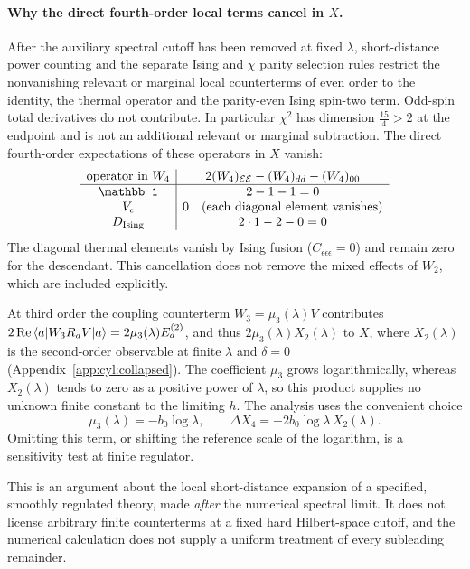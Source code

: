 \documentclass[11pt,a4paper]{article}
\numberwithin{equation}{section}
\newcommand{\ket}[1]{\lvert#1\rangle}
\begin{document}
\paragraph{Why the direct fourth-order local terms cancel in $X$.} After the auxiliary spectral cutoff has been removed
at fixed $\lambda$, short-distance power counting and the separate Ising and $\chi$ parity selection rules restrict the
nonvanishing relevant or marginal local counterterms of even order to the identity, the thermal operator and the
parity-even Ising spin-two term. Odd-spin total derivatives do not contribute. In particular $\chi^2$ has dimension
$\frac{15}{4}>2$ at the endpoint and is not an additional relevant or marginal subtraction. The direct fourth-order
expectations of these operators in $X$ vanish:
\begin{equation}
\begin{array}{c|c}
 \text{operator in }W_4 & 2(W_4)_{\mathcal E\mathcal E}-(W_4)_{dd}-(W_4)_{00}\\\hline
 \mathbb 1 & 2-1-1=0\\
 V_\epsilon & 0\quad\text{(each diagonal element vanishes)}\\
 D_{\rm Ising} & 2\cdot1-2-0=0
\end{array}
\label{eq:cyl:W4}
\end{equation}
The diagonal thermal elements vanish by Ising fusion ($C_{\epsilon\epsilon\epsilon}=0$) and remain zero for the
descendant. This cancellation does not remove the mixed effects of $W_2$, which are included explicitly.

At third order the coupling counterterm $W_3=\mu_3(\lambda)V$ contributes
$2\,{\rm Re}\,\langle a\rvert W_3R_aV\ket a=2\mu_3(\lambda)E_a^{(2)}$, and thus $2\mu_3(\lambda)X_2(\lambda)$ to $X$,
where $X_2(\lambda)$ is the second-order observable at finite $\lambda$ and $\delta=0$
(Appendix~\ref{app:cyl:collapsed}). The coefficient $\mu_3$ grows logarithmically, whereas $X_2(\lambda)$ tends to zero as a
positive power of $\lambda$, so this product supplies no unknown finite constant to the limiting $h$. The analysis uses
the convenient choice
\begin{equation}
 \mu_3(\lambda)=-b_0\log\lambda,\qquad \Delta X_4=-2b_0\log\lambda\,X_2(\lambda).
 \label{eq:cyl:couplinglog}
\end{equation}
Omitting this term, or shifting the reference scale of the logarithm, is a sensitivity test at finite regulator.

This is an argument about the local short-distance expansion of a specified, smoothly regulated theory, made
\emph{after} the numerical spectral limit. It does not license arbitrary finite counterterms at a fixed hard
Hilbert-space cutoff, and the numerical calculation does not supply a uniform treatment of every subleading
remainder.
\end{document}
